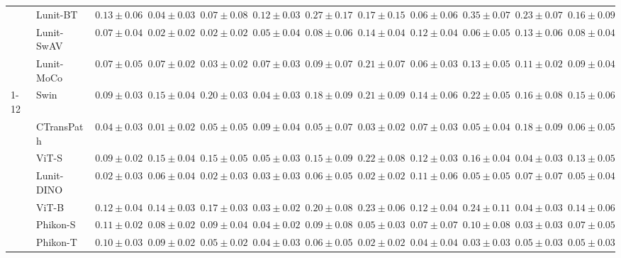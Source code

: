 \begin{tabular}{ll|cccc|c|cccc|c}
 & Lunit-BT~\cite{kang2023benchmarking} & $0.13 \pm 0.06$ & $0.04 \pm 0.03$ & $0.07 \pm 0.08$ & $0.12 \pm 0.03$ & $0.27 \pm 0.17$ & $0.17 \pm 0.15$ & $0.06 \pm 0.06$ & $0.35 \pm 0.07$ & $0.23 \pm 0.07$ & $0.16 \pm 0.09$ \\
 & Lunit-SwAV~\cite{kang2023benchmarking} & $0.07 \pm 0.04$ & $\mathbf{0.02 \pm 0.02}$ & $\mathbf{0.02 \pm 0.02}$ & $0.05 \pm 0.04$ & $0.08 \pm 0.06$ & $0.14 \pm 0.04$ & $0.12 \pm 0.04$ & $0.06 \pm 0.05$ & $0.13 \pm 0.06$ & $0.08 \pm 0.04$ \\
 & Lunit-MoCo~\cite{kang2023benchmarking} & $0.07 \pm 0.05$ & $0.07 \pm 0.02$ & $0.03 \pm 0.02$ & $0.07 \pm 0.03$ & $0.09 \pm 0.07$ & $0.21 \pm 0.07$ & $0.06 \pm 0.03$ & $0.13 \pm 0.05$ & $0.11 \pm 0.02$ & $0.09 \pm 0.04$ \\
\cline{1-12}
\multirow[t]{12}{*}{Transformer} & Swin~\cite{liu2021swin} & $0.09 \pm 0.03$ & $0.15 \pm 0.04$ & $0.20 \pm 0.03$ & $0.04 \pm 0.03$ & $0.18 \pm 0.09$ & $0.21 \pm 0.09$ & $0.14 \pm 0.06$ & $0.22 \pm 0.05$ & $0.16 \pm 0.08$ & $0.15 \pm 0.06$ \\
 & CTransPath~\cite{wang2022transformer} & $0.04 \pm 0.03$ & $\mathbf{0.01 \pm 0.02}$ & $0.05 \pm 0.05$ & $0.09 \pm 0.04$ & $\mathbf{0.05 \pm 0.07}$ & $0.03 \pm 0.02$ & $0.07 \pm 0.03$ & $0.05 \pm 0.04$ & $0.18 \pm 0.09$ & $0.06 \pm 0.05$ \\
 & ViT-S~\cite{kolesnikov2021image} & $0.09 \pm 0.02$ & $0.15 \pm 0.04$ & $0.15 \pm 0.05$ & $0.05 \pm 0.03$ & $0.15 \pm 0.09$ & $0.22 \pm 0.08$ & $0.12 \pm 0.03$ & $0.16 \pm 0.04$ & $0.04 \pm 0.03$ & $0.13 \pm 0.05$ \\
 & Lunit-DINO~\cite{kang2023benchmarking} & $\mathbf{0.02 \pm 0.03}$ & $0.06 \pm 0.04$ & $\mathbf{0.02 \pm 0.03}$ & $\mathbf{0.03 \pm 0.03}$ & $0.06 \pm 0.05$ & $\mathbf{0.02 \pm 0.02}$ & $0.11 \pm 0.06$ & $0.05 \pm 0.05$ & $0.07 \pm 0.07$ & $\mathbf{0.05 \pm 0.04}$ \\
 & ViT-B~\cite{kolesnikov2021image} & $0.12 \pm 0.04$ & $0.14 \pm 0.03$ & $0.17 \pm 0.03$ & $0.03 \pm 0.02$ & $0.20 \pm 0.08$ & $0.23 \pm 0.06$ & $0.12 \pm 0.04$ & $0.24 \pm 0.11$ & $0.04 \pm 0.03$ & $0.14 \pm 0.06$ \\
 & Phikon-S~\cite{filiot2023scaling} & $0.11 \pm 0.02$ & $0.08 \pm 0.02$ & $0.09 \pm 0.04$ & $0.04 \pm 0.02$ & $0.09 \pm 0.08$ & $0.05 \pm 0.03$ & $0.07 \pm 0.07$ & $0.10 \pm 0.08$ & $\mathbf{0.03 \pm 0.03}$ & $0.07 \pm 0.05$ \\
 & Phikon-T~\cite{filiot2023scaling} & $0.10 \pm 0.03$ & $0.09 \pm 0.02$ & $0.05 \pm 0.02$ & $0.04 \pm 0.03$ & $0.06 \pm 0.05$ & $0.02 \pm 0.02$ & $0.04 \pm 0.04$ & $\mathbf{0.03 \pm 0.03}$ & $0.05 \pm 0.03$ & $0.05 \pm 0.03$ \\

\end{tabular}
